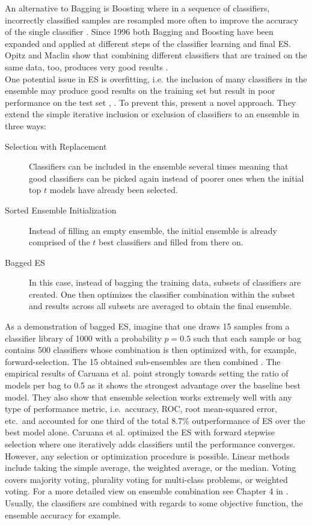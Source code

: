 An alternative to Bagging is Boosting where in a sequence of classifiers, incorrectly classified samples are resampled more often to improve the accuracy of the single classifier \cite[p. 173]{opitz1999popular}. Since 1996 both Bagging and Boosting have been expanded and applied at different steps of the classifier learning and final ES. Opitz and Maclin show that combining different classifiers that are trained on the same data, too, produces very good results \cite[p. 170]{opitz1999popular}. \\

One potential issue in ES is overfitting, i.e. the inclusion of many classifiers in the ensemble may produce good results on the training set but result in poor performance on the test set \cite[p. 253]{sun2011bagging}, \cite[p. 2092]{cawley2010over}. To prevent this, \cite{caruana2004ensemble} present a novel approach. They extend the simple iterative inclusion or exclusion of classifiers to an ensemble in three ways: 
\begin{description}
	\item[Selection with Replacement] Classifiers can be included in the ensemble several times meaning that good classifiers can be picked again instead of poorer ones when the initial top $t$ models have already been selected.
	\item[Sorted Ensemble Initialization] Instead of filling an empty ensemble, the initial ensemble is already comprised of the $t$ best classifiers and filled from there on.	
	\item[Bagged ES] In this case, instead of bagging the training data, subsets of classifiers are created. One then optimizes the classifier combination within the subset and results across all subsets are averaged to obtain the final ensemble.
\end{description}
As a demonstration of bagged ES, imagine that one draws 15 samples from a classifier library of 1000 with a probability $p =0.5$ such that each sample or bag contains 500 classifiers whose combination is then optimized with, for example, forward-selection. The 15 obtained sub-ensembles are then combined \cite[p. 3]{caruana2004ensemble}.
The empirical results of Caruana et al. point strongly towards setting the ratio of models per bag to 0.5 as it shows the strongest advantage over the baseline best model. They also show that ensemble selection works extremely well with any type of performance metric, \mbox{i.e. }accuracy, ROC, root mean-squared error, \mbox{etc. }and accounted for one third of the total 8.7\% outperformance of ES over the best model alone. Caruana et al. optimized the ES with forward stepwise selection where one iteratively adds classifiers until the performance converges. However, any selection or optimization procedure is possible. Linear methods include taking the simple average, the weighted average, or the median. Voting covers majority voting, plurality voting for multi-class problems, or weighted voting. For a more detailed view on ensemble combination see Chapter 4 in \cite{zhou2012ensemble}. Usually, the classifiers are combined with regards to some objective function, the ensemble accuracy for example. 

